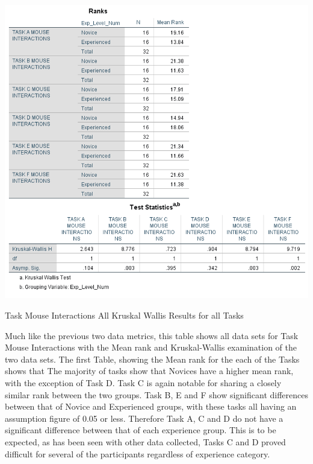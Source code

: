 \begin{table}[H]
\includegraphics[width=\linewidth]{Screenshots/UXResearchDataFiles/UXTaskMouseInteractionsData/AllTasksMouseInteractionsKWEdited.png}
\label{AllMouseInteractionsKW}
\caption{Task Mouse Interactions All Kruskal Wallis Results for all Tasks}
\end{table}

Much like the previous two data metrics, this table shows all data sets for Task Mouse Interactions with the Mean rank and Kruskal-Wallis examination of the two data sets. The first Table, showing the Mean rank for the each of the Tasks shows that The majority of tasks show that Novices have a higher mean rank, with the exception of Task D. Task C is again notable for sharing a closely similar rank between the two groups. Task B, E and F show significant differences between that of Novice and Experienced groups, with these tasks all having an assumption figure of 0.05 or less. Therefore Task A, C and D do not have a significant difference between that of each experience group. This is to be expected, as has been seen with other data collected, Tasks C and D proved difficult for several of the participants regardless of experience category.
